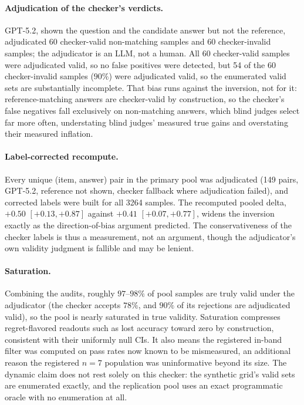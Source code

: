 \documentclass[11pt]{article}
\begin{document}
\paragraph{Adjudication of the checker's verdicts.}
GPT-5.2, shown the question and the candidate answer but not the reference, adjudicated 60 checker-valid non-matching samples and 60 checker-invalid samples; the adjudicator is an LLM, not a human.
All 60 checker-valid samples were adjudicated valid, so no false positives were detected, but 54 of the 60 checker-invalid samples ($90\%$) were adjudicated valid, so the enumerated valid sets are substantially incomplete.
That bias runs against the inversion, not for it: reference-matching answers are checker-valid by construction, so the checker's false negatives fall exclusively on non-matching answers, which blind judges select far more often, understating blind judges' measured true gains and overstating their measured inflation.

\paragraph{Label-corrected recompute.}
Every unique (item, answer) pair in the primary pool was adjudicated (149 pairs, GPT-5.2, reference not shown, checker fallback where adjudication failed), and corrected labels were built for all 3264 samples.
The recomputed pooled delta, $+0.50$ $[+0.13, +0.87]$ against $+0.41$ $[+0.07, +0.77]$, widens the inversion exactly as the direction-of-bias argument predicted.
The conservativeness of the checker labels is thus a measurement, not an argument, though the adjudicator's own validity judgment is fallible and may be lenient.

\paragraph{Saturation.}
Combining the audits, roughly $97$--$98\%$ of pool samples are truly valid under the adjudicator (the checker accepts $78\%$, and $90\%$ of its rejections are adjudicated valid), so the pool is nearly saturated in true validity.
Saturation compresses regret-flavored readouts such as lost accuracy toward zero by construction, consistent with their uniformly null CIs.
It also means the registered in-band filter was computed on pass rates now known to be mismeasured, an additional reason the registered $n{=}7$ population was uninformative beyond its size.
The dynamic claim does not rest solely on this checker: the synthetic grid's valid sets are enumerated exactly, and the replication pool uses an exact programmatic oracle with no enumeration at all.
\end{document}
